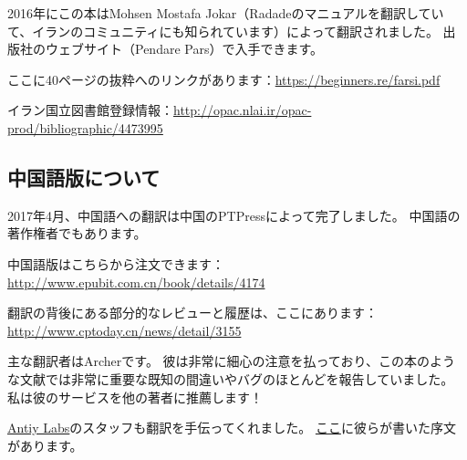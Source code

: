 2016年にこの本はMohsen Mostafa Jokar（Radadeのマニュアルを翻訳していて、イランのコミュニティにも知られています）によって翻訳されました。 出版社のウェブサイト（Pendare Pars）で入手できます。

ここに40ページの抜粋へのリンクがあります：\url{https://beginners.re/farsi.pdf}

イラン国立図書館登録情報：\url{http://opac.nlai.ir/opac-prod/bibliographic/4473995}

\subsection*{中国語版について}

2017年4月、中国語への翻訳は中国のPTPressによって完了しました。 中国語の著作権者でもあります。

中国語版はこちらから注文できます：\url{http://www.epubit.com.cn/book/details/4174}

翻訳の背後にある部分的なレビューと履歴は、ここにあります：\url{http://www.cptoday.cn/news/detail/3155}

主な翻訳者はArcherです。 彼は非常に細心の注意を払っており、この本のような文献では非常に重要な既知の間違いやバグのほとんどを報告していました。 私は彼のサービスを他の著者に推薦します！

\href{http://www.antiy.net/}{Antiy Labs}のスタッフも翻訳を手伝ってくれました。 \href{http://www.epubit.com.cn/book/onlinechapter/51413}{ここ}に彼らが書いた序文があります。

